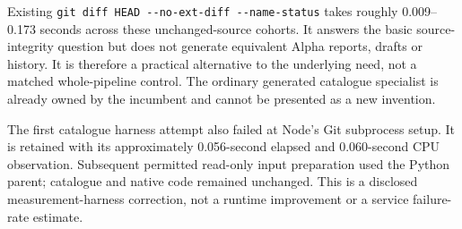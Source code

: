 \documentclass[11pt,letterpaper]{article}
\newcommand{\code}[1]{{\small\nolinkurl{#1}}}
\begin{document}
Existing \code{git diff HEAD --no-ext-diff --name-status} takes roughly 0.009--0.173 seconds across these unchanged-source cohorts. It answers the basic source-integrity question but does not generate equivalent Alpha reports, drafts or history. It is therefore a practical alternative to the underlying need, not a matched whole-pipeline control. The ordinary generated catalogue specialist is already owned by the incumbent and cannot be presented as a new invention.

The first catalogue harness attempt also failed at Node's Git subprocess setup. It is retained with its approximately 0.056-second elapsed and 0.060-second CPU observation. Subsequent permitted read-only input preparation used the Python parent; catalogue and native code remained unchanged. This is a disclosed measurement-harness correction, not a runtime improvement or a service failure-rate estimate.
\end{document}
